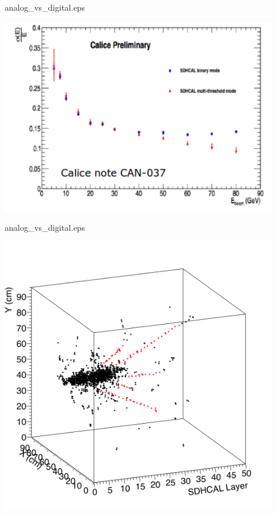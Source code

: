 \begin{frame}{analog\_vs\_digital.eps}
  \centerline{\includegraphics[width=0.9\textwidth]{images/Beam2012Resolution}}
\end{frame}
\begin{frame}{analog\_vs\_digital.eps}
  \centerline{\includegraphics[width=0.9\textwidth]{images/Beam2012Hough}}
\end{frame}

